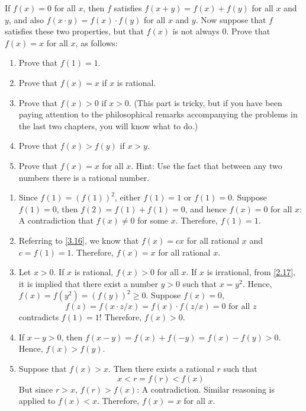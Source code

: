 \begin{pr} \label{3.17}
  If $f(x) = 0$ for all $x$, then $f$ satisfies $f(x + y) = f(x) + f(y)$ for all
  $x$ and $y$, and also $f(x \cdot y) = f(x) \cdot f(y)$ for all $x$ and $y$. Now suppose
  that $f$ satisfies these two properties, but that $f(x)$ is not always $0$. Prove
  that $f(x) = x$ for all $x$, as follows:
  \begin{enumerate}[label = (\alph*)]
    \item Prove that $f(1) = 1$.
    \item Prove that $f(x) = x$ if $x$ is rational.
    \item Prove that $f(x) > 0$ if $x > 0$. (This part is tricky, but if you have
    been paying attention to the philosophical remarks accompanying the problems
    in the last two chapters, you will know what to do.)
    \item Prove that $f(x) > f(y)$ if $x > y$.
    \item Prove that $f(x) = x$ for all $x$. Hint: Use the fact that between
    any two numbers there is a rational number.
  \end{enumerate}
\end{pr}

\begin{solution}
  \begin{enumerate}[label = (\alph*)]
    \item Since $f(1) = (f(1))^2$, either $f(1) = 1$ or $f(1) = 0$. Suppose $f(1) = 0$,
    then $f(2) = f(1) + f(1) = 0$, and hence $f(x) = 0$ for all $x$: A contradiction
    that $f(x) \neq 0$ for some $x$. Therefore, $f(1) = 1$.
    \item Referring to \ref{3.16}, we know that $f(x) = cx$ for all rational $x$
    and $c = f(1) = 1$. Therefore, $f(x) = x$ for all rational $x$.
    \item Let $x > 0$. If $x$ is rational, $f(x) > 0$ for all $x$. If $x$ is
    irrational, from \ref{2.17}, it is implied that there exist a number $y > 0$
    such that $x = y^2$. Hence, $f(x) = f(y^2) = (f(y))^2 \geq 0$. Suppose $f(x) = 0$,
    \begin{equation*}
      f(z) = f(x \cdot z/x) = f(x) \cdot f(z/x) = 0 \text{ for all } z
    \end{equation*}
    contradicts $f(1) = 1$! Therefore, $f(x) > 0$.
    \item If $x - y > 0$, then $f(x - y) = f(x) + f(-y) = f(x) - f(y) > 0$. Hence,
    $f(x) > f(y)$.
    \item Suppose that $f(x) > x$. Then there exists a rational $r$ such that
    \begin{equation*}
      x < r = f(r) < f(x)
    \end{equation*}
    But since $r > x$, $f(r) > f(x)$: A contradiction. Similar reasoning is applied
    to $f(x) < x$. Therefore, $f(x) = x$ for all $x$.
  \end{enumerate}
\end{solution}

